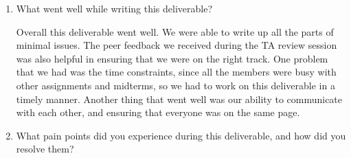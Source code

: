 \documentclass[12pt, titlepage]{article}
\begin{document}
\begin{enumerate}
  \item What went well while writing this deliverable? 

  Overall this deliverable went well. We were able to write up all the parts of minimal issues. The peer feedback we received during the TA review session was also helpful in ensuring that we were on the right track. One problem that we had was the time constraints, since all the members were busy with other assignments and midterms, so we had to work on this deliverable in a timely manner. Another thing that went well was our ability to communicate with each other, and ensuring that everyone was on the same page.

  \item What pain points did you experience during this deliverable, and how
    did you resolve them?
  


\end{enumerate}
\end{document}
